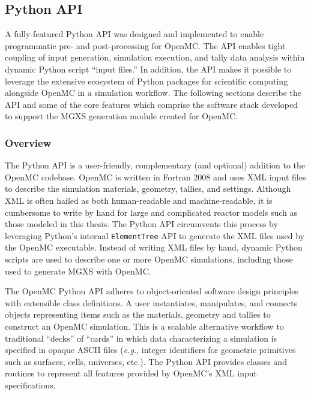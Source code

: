 \subsection{Python API}
\label{subsec:chap4-py-api}

A fully-featured Python \ac{API} was designed and implemented to enable programmatic pre- and post-processing for OpenMC. The \ac{API} enables tight coupling of input generation, simulation execution, and tally data analysis within dynamic Python script ``input files.'' In addition, the \ac{API} makes it possible to leverage the extensive ecosystem of Python packages for scientific computing alongside OpenMC in a simulation workflow. The following sections describe the \ac{API} and some of the core features which comprise the software stack developed to support the \ac{MGXS} generation module created for OpenMC.

\subsubsection{Overview}
\label{subsubsec:chap4-py-api-overview}


The Python \ac{API} is a user-friendly, complementary (and optional) addition to the OpenMC codebase. OpenMC is written in Fortran 2008 and uses \ac{XML} input files to describe the simulation materials, geometry, tallies, and settings. Although \ac{XML} is often hailed as both human-readable and machine-readable, it is cumbersome to write by hand for large and complicated reactor models such as those modeled in this thesis. The Python \ac{API} circumvents this process by leveraging Python's internal \texttt{ElementTree} \ac{API} to generate the \ac{XML} files used by the OpenMC executable. Instead of writing \ac{XML} files by hand, dynamic Python scripts are used to describe one or more OpenMC simulations, including those used to generate \ac{MGXS} with OpenMC.

The OpenMC Python \ac{API} adheres to object-oriented software design principles with extensible class definitions. A user instantiates, manipulates, and connects objects representing items such as the materials, geometry and tallies to construct an OpenMC simulation. This is a scalable alternative workflow to traditional ``decks'' of ``cards'' in which data characterizing a simulation is specified in opaque \ac{ASCII} files (\textit{e.g.}, integer identifiers for geometric primitives such as surfaces, cells, universes, etc.). The Python \ac{API} provides classes and routines to represent all features provided by OpenMC's \ac{XML} input specifications.

